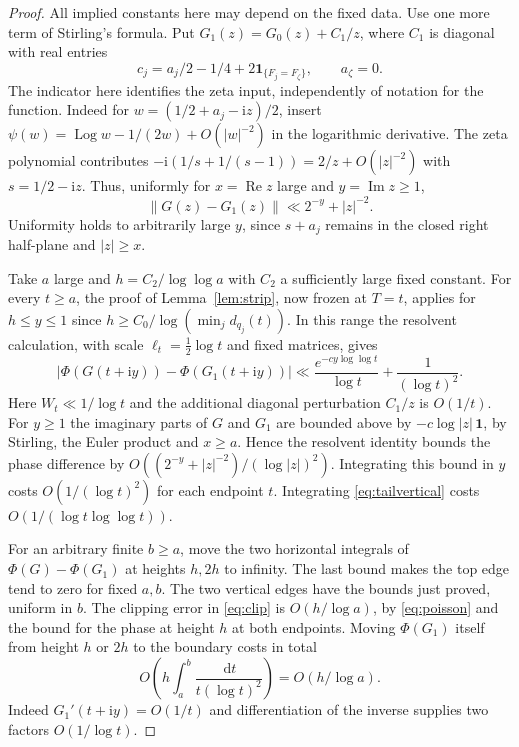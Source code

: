 \documentclass[11pt]{article}
\DeclareMathOperator{\Log}{Log}\DeclareMathOperator{\tr}{tr}\DeclareMathOperator{\diag}{diag}
\newcommand{\dd}{\,\mathrm d}\newcommand{\ii}{\mathrm i}
\newcommand{\Imn}{\operatorname{Im}}\newcommand{\Ren}{\operatorname{Re}}
\newcommand{\id}{\mathbf1}\newcommand{\norm}[1]{\left\lVert#1\right\rVert}
\newcommand{\ph}{\Phi}\newcommand{\Gm}{G_0}
\begin{document}
\begin{proof}
All implied constants here may depend on the fixed data. Use one more term of Stirling's formula. Put $G_1(z)=\Gm(z)+C_1/z$, where $C_1$ is diagonal with real entries
\[
 c_j=a_j/2-1/4+2\id_{\{F_j=F_\zeta\}},\qquad a_\zeta=0 .
\]
The indicator here identifies the zeta input, independently of notation for the function. Indeed for $w=(1/2+a_j-\ii z)/2$, insert $\psi(w)=\Log w-1/(2w)+O(|w|^{-2})$ in the logarithmic derivative. The zeta polynomial contributes $-\ii(1/s+1/(s-1))=2/z+O(|z|^{-2})$ with $s=1/2-\ii z$. Thus, uniformly for $x=\Ren z$ large and $y=\Imn z\ge1$,
\begin{equation}\label{eq:stir2}
 \norm{G(z)-G_1(z)}\ll 2^{-y}+|z|^{-2}.
\end{equation}
Uniformity holds to arbitrarily large $y$, since $s+a_j$ remains in the closed right half-plane and $|z|\ge x$.

Take $a$ large and $h=C_2/\log\log a$ with $C_2$ a sufficiently large fixed constant. For every $t\ge a$, the proof of Lemma~\ref{lem:strip}, now frozen at $T=t$, applies for $h\le y\le1$ since $h\ge C_0/\log(\min_j d_{q_j}(t))$. In this range the resolvent calculation, with scale $\ell_t=\tfrac12\log t$ and fixed matrices, gives
\begin{equation}\label{eq:tailvertical}
 |\ph(G(t+\ii y))-\ph(G_1(t+\ii y))|
 \ll \frac{e^{-c y\log\log t}}{\log t}+\frac1{(\log t)^2}.
\end{equation}
Here $W_t\ll1/\log t$ and the additional diagonal perturbation $C_1/z$ is $O(1/t)$. For $y\ge1$ the imaginary parts of $G$ and $G_1$ are bounded above by $-c\log|z|\,\id$, by Stirling, the Euler product and $x\ge a$. Hence the resolvent identity bounds the phase difference by $O((2^{-y}+|z|^{-2})/(\log|z|)^2)$. Integrating this bound in $y$ costs $O(1/(\log t)^2)$ for each endpoint $t$. Integrating \eqref{eq:tailvertical} costs $O(1/(\log t\log\log t))$.

For an arbitrary finite $b\ge a$, move the two horizontal integrals of $\ph(G)-\ph(G_1)$ at heights $h,2h$ to infinity. The last bound makes the top edge tend to zero for fixed $a,b$. The two vertical edges have the bounds just proved, uniform in $b$. The clipping error in \eqref{eq:clip} is $O(h/\log a)$, by \eqref{eq:poisson} and the bound for the phase at height $h$ at both endpoints. Moving $\ph(G_1)$ itself from height $h$ or $2h$ to the boundary costs in total
\[
 O\left(h\int_a^b\frac{\dd t}{t(\log t)^2}\right)=O(h/\log a).
\]
Indeed $G_1'(t+\ii y)=O(1/t)$ and differentiation of the inverse supplies two factors $O(1/\log t)$.


\end{proof}
\end{document}
